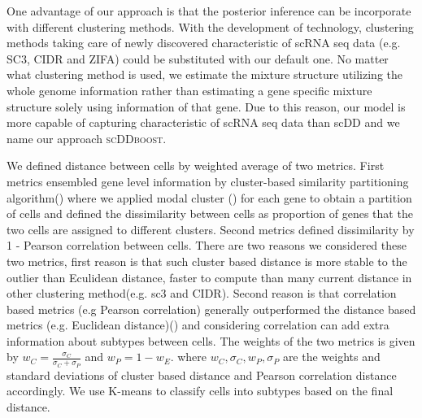 \documentclass[11pt]{amsart}
\begin{document}
One advantage of our approach is that the posterior inference can be incorporate with different clustering methods. With the development of technology, clustering methods taking care of newly discovered characteristic of scRNA seq data (e.g. SC3\cite{sc3}, CIDR\cite{CIDR} and ZIFA\cite{ZIFA}) could be substituted with our default one. No matter what clustering method is used, we estimate the mixture structure utilizing the whole genome information rather than estimating a gene specific mixture structure solely using information of that gene. Due to this reason, our model is more capable of capturing characteristic of scRNA seq data than scDD and we name our approach \textsc{scDDboost}. 

We defined distance between cells by weighted average of two metrics. First metrics ensembled gene level information by cluster-based similarity partitioning algorithm(\cite{ref:cspa}) where we applied modal cluster (\cite{ref:dahl}) for each gene to obtain a partition of cells and defined the dissimilarity between cells as proportion of genes that the two cells are assigned to different clusters. 
Second metrics defined dissimilarity by 1 - Pearson correlation between cells. There are two reasons we considered these two metrics, first reason is that such cluster based distance is more stable to the outlier than Eculidean distance, faster to compute than many current distance in other clustering method(e.g. sc3 and CIDR). Second reason is that correlation based metrics (e.g Pearson correlation) generally outperformed the distance based metrics (e.g. Euclidean distance)(\cite{Cor}) and considering correlation can add extra information about subtypes between cells. The weights of the two metrics is given by $w_C = \frac{\sigma_C}{\sigma_C + \sigma_P}$ and $w_P = 1 - w_E$. where $w_C,\sigma_C, w_P, \sigma_P$ are the weights and standard deviations of cluster based distance and Pearson correlation distance accordingly.  
 We use K-means to classify cells into subtypes based on the final distance. 
\end{document}
